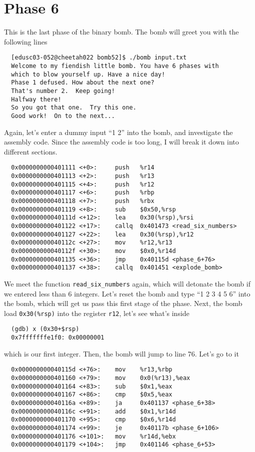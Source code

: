 \section{Phase 6}
This is the last phase of the binary bomb. The bomb will greet you with the following lines
{\renewcommand\fcolorbox[4][]{\textcolor{black}{\strut#4}}
\begin{verbatim}
  [edusc03-052@cheetah022 bomb52]$ ./bomb input.txt
  Welcome to my fiendish little bomb. You have 6 phases with
  which to blow yourself up. Have a nice day!
  Phase 1 defused. How about the next one?
  That's number 2.  Keep going!
  Halfway there!
  So you got that one.  Try this one.
  Good work!  On to the next...
\end{verbatim}
}\noindent
Again, let's enter a dummy input ``1 2'' into the bomb, and investigate the assembly code. Since the assembly code is too long, I will break it down into different sections.
{\renewcommand\fcolorbox[4][]{\textcolor{cyan}{\strut#4}}
\begin{verbatim}
  0x0000000000401111 <+0>:     push   %r14
  0x0000000000401113 <+2>:     push   %r13
  0x0000000000401115 <+4>:     push   %r12
  0x0000000000401117 <+6>:     push   %rbp
  0x0000000000401118 <+7>:     push   %rbx
  0x0000000000401119 <+8>:     sub    $0x50,%rsp
  0x000000000040111d <+12>:    lea    0x30(%rsp),%rsi
  0x0000000000401122 <+17>:    callq  0x401473 <read_six_numbers>
  0x0000000000401127 <+22>:    lea    0x30(%rsp),%r12
  0x000000000040112c <+27>:    mov    %r12,%r13
  0x000000000040112f <+30>:    mov    $0x0,%r14d
  0x0000000000401135 <+36>:    jmp    0x40115d <phase_6+76>
  0x0000000000401137 <+38>:    callq  0x401451 <explode_bomb>
\end{verbatim}
}\noindent
We meet the function \verb+read_six_numbers+ again, which will detonate the bomb if we entered less than 6 integers. Let's reset the bomb and type ``1 2 3 4 5 6'' into the bomb, which will get us pass this first stage of the phase. Next, the bomb load \verb+0x30(%rsp)+ into the register \verb+r12+, let's see what's inside
{\renewcommand\fcolorbox[4][]{\textcolor{black}{\strut#4}}
\begin{verbatim}
  (gdb) x (0x30+$rsp)
  0x7fffffffe1f0: 0x00000001
\end{verbatim}
}\noindent
which is our first integer. Then, the bomb will jump to line 76. Let's go to it
{\renewcommand\fcolorbox[4][]{\textcolor{cyan}{\strut#4}}
\begin{verbatim}
  0x000000000040115d <+76>:    mov    %r13,%rbp
  0x0000000000401160 <+79>:    mov    0x0(%r13),%eax
  0x0000000000401164 <+83>:    sub    $0x1,%eax
  0x0000000000401167 <+86>:    cmp    $0x5,%eax
  0x000000000040116a <+89>:    ja     0x401137 <phase_6+38>
  0x000000000040116c <+91>:    add    $0x1,%r14d
  0x0000000000401170 <+95>:    cmp    $0x6,%r14d
  0x0000000000401174 <+99>:    je     0x40117b <phase_6+106>
  0x0000000000401176 <+101>:   mov    %r14d,%ebx
  0x0000000000401179 <+104>:   jmp    0x401146 <phase_6+53>
\end{verbatim}
}\noindent
